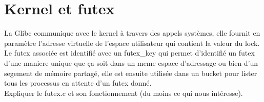 \section*{Kernel et futex}
La Glibc communique avec le kernel à travers des appels systèmes, elle fournit 
en paramètre l'adresse virtuelle de l'espace utilisateur qui contient la 
valeur du lock.
\\

Le futex associée est identifié avec un futex\_key qui permet d'identifié un futex
d'une maniere unique que ça soit dans un meme espace d'adressage ou bien d'un
segement de mémoire partagé, elle est ensuite utilisée dans un bucket pour lister
tous les processus en attente d'un futex donné.
\\

Expliquer le futex.c et son fonctionnement (du moins ce qui nous intéresse).